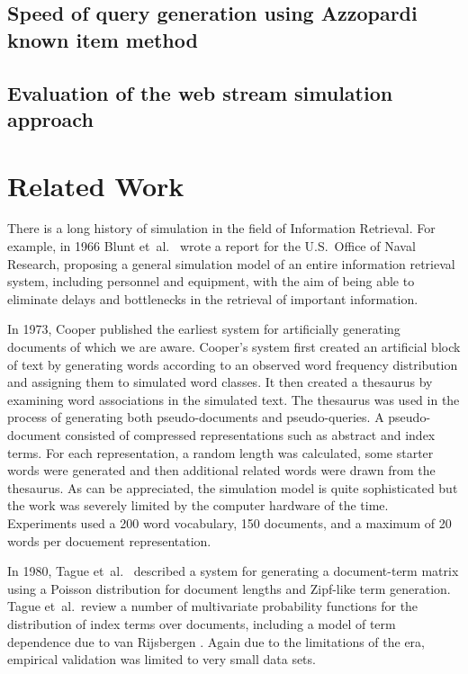 \documentclass[11pt]{report}
\begin{document}
\section{Speed of query generation using Azzopardi known item method}


\section{Evaluation of the web stream simulation approach}
\label{sec:webStreamSimEval}


\chapter{Related Work} %
\label{RelatedWork}

There is a long history of simulation in the field of Information
Retrieval.  For example, in 1966 Blunt et~al.~\cite{BluntDuquetLuckie66} wrote a report
for the U.S.~Office of Naval Research, proposing a general simulation 
model of an entire information retrieval system, including personnel
and equipment, with the aim of being able to eliminate delays and
bottlenecks in the retrieval of important information.

In 1973, Cooper \cite{Cooper73} published the earliest
system for artificially generating documents of which we are
aware.  Cooper's
system first created an artificial block of text by generating words
according to an observed word frequency distribution and assigning
them to simulated word classes. It then created a thesaurus by
examining word associations in the simulated text.  The thesaurus was
used in the process of generating both pseudo-documents and
pseudo-queries.  A pseudo-document consisted of compressed
representations such as abstract and index terms.  For each
representation, a random length was calculated, some starter words
were generated and then additional related words were drawn from the
thesaurus.  As can be appreciated, the simulation model is quite sophisticated
but the work was severely limited by the computer hardware of the time.
Experiments used a 200 word vocabulary, 150 documents, and a maximum
of 20 words per docuement representation. 

In 1980, Tague et~al.~\cite{TagueNelsonWu80} described a system for
generating a document-term matrix using a Poisson distribution for
document lengths and Zipf-like term generation.
Tague et~al.~review a number of multivariate probability functions for the
distribution of index terms over documents, including a model of
term dependence due to van Rijsbergen \cite{vanRijsbergen1977}.
Again due to the limitations of the era, empirical validation was
limited to very small data sets.
\end{document}
